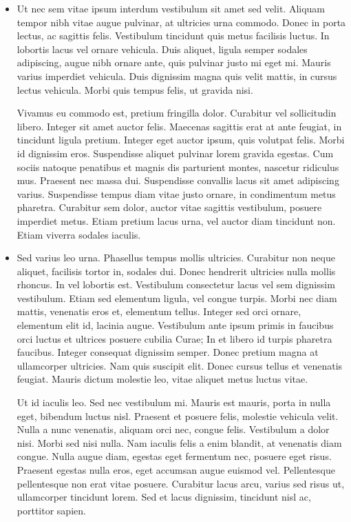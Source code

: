 \documentclass[10pt,]{article}
\theoremstyle{plain}
\theoremstyle{definition}
\theoremstyle{definition}
\theoremstyle{definition}
\theoremstyle{definition}
\theoremstyle{definition}
\theoremstyle{definition}
\numberwithin{equation}{section}
\begin{document}
\begin{multicols}{2}
\begin{itemize}[label=\textbullet]
\item{}\hypertarget{p-164}{}%
Ut nec sem vitae ipsum interdum vestibulum sit amet sed velit. Aliquam tempor nibh vitae augue pulvinar, at ultricies urna commodo. Donec in porta lectus, ac sagittis felis. Vestibulum tincidunt quis metus facilisis luctus. In lobortis lacus vel ornare vehicula. Duis aliquet, ligula semper sodales adipiscing, augue nibh ornare ante, quis pulvinar justo mi eget mi. Mauris varius imperdiet vehicula. Duis dignissim magna quis velit mattis, in cursus lectus vehicula. Morbi quis tempus felis, ut gravida nisi.%
\par
\hypertarget{p-165}{}%
Vivamus eu commodo est, pretium fringilla dolor. Curabitur vel sollicitudin libero. Integer sit amet auctor felis. Maecenas sagittis erat at ante feugiat, in tincidunt ligula pretium. Integer eget auctor ipsum, quis volutpat felis. Morbi id dignissim eros. Suspendisse aliquet pulvinar lorem gravida egestas. Cum sociis natoque penatibus et magnis dis parturient montes, nascetur ridiculus mus. Praesent nec massa dui. Suspendisse convallis lacus sit amet adipiscing varius. Suspendisse tempus diam vitae justo ornare, in condimentum metus pharetra. Curabitur sem dolor, auctor vitae sagittis vestibulum, posuere imperdiet metus. Etiam pretium lacus urna, vel auctor diam tincidunt non. Etiam viverra sodales iaculis.%
\item{}\hypertarget{p-166}{}%
Sed varius leo urna. Phasellus tempus mollis ultricies. Curabitur non neque aliquet, facilisis tortor in, sodales dui. Donec hendrerit ultricies nulla mollis rhoncus. In vel lobortis est. Vestibulum consectetur lacus vel sem dignissim vestibulum. Etiam sed elementum ligula, vel congue turpis. Morbi nec diam mattis, venenatis eros et, elementum tellus. Integer sed orci ornare, elementum elit id, lacinia augue. Vestibulum ante ipsum primis in faucibus orci luctus et ultrices posuere cubilia Curae; In et libero id turpis pharetra faucibus. Integer consequat dignissim semper. Donec pretium magna at ullamcorper ultricies. Nam quis suscipit elit. Donec cursus tellus et venenatis feugiat. Mauris dictum molestie leo, vitae aliquet metus luctus vitae.%
\par
\hypertarget{p-167}{}%
Ut id iaculis leo. Sed nec vestibulum mi. Mauris est mauris, porta in nulla eget, bibendum luctus nisl. Praesent et posuere felis, molestie vehicula velit. Nulla a nunc venenatis, aliquam orci nec, congue felis. Vestibulum a dolor nisi. Morbi sed nisi nulla. Nam iaculis felis a enim blandit, at venenatis diam congue. Nulla augue diam, egestas eget fermentum nec, posuere eget risus. Praesent egestas nulla eros, eget accumsan augue euismod vel. Pellentesque pellentesque non erat vitae posuere. Curabitur lacus arcu, varius sed risus ut, ullamcorper tincidunt lorem. Sed et lacus dignissim, tincidunt nisl ac, porttitor sapien.%
\end{itemize}
\end{multicols}
%
\typeout{************************************************}
\typeout{************************************************}
\end{document}
